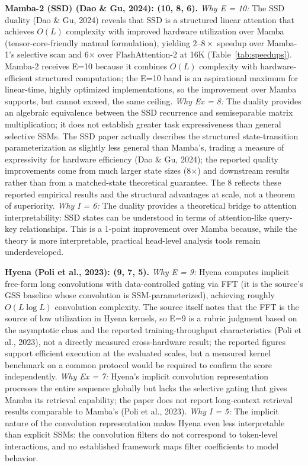 \documentclass[10pt,twocolumn]{article}
\begin{document}
\textbf{Mamba-2 (SSD) (Dao \& Gu, 2024): (10, 8, 6).}
\textit{Why E = 10:} The SSD duality (Dao \& Gu, 2024) reveals that SSD is a structured linear attention that achieves $O(L)$ complexity with improved hardware utilization over Mamba (tensor-core-friendly matmul formulation), yielding $2$--$8\times$ speedup over Mamba-1's selective scan and 6$\times$ over FlashAttention-2 at 16K (Table~\ref{tab:speedups}). Mamba-2 receives E=10 because it combines $O(L)$ complexity with hardware-efficient structured computation; the E=10 band is an aspirational maximum for linear-time, highly optimized implementations, so the improvement over Mamba supports, but cannot exceed, the same ceiling. \textit{Why Ex = 8:} The duality provides an algebraic equivalence between the SSD recurrence and semiseparable matrix multiplication; it does not establish greater task expressiveness than general selective SSMs. The SSD paper actually describes the structured state-transition parameterization as slightly less general than Mamba's, trading a measure of expressivity for hardware efficiency (Dao \& Gu, 2024); the reported quality improvements come from much larger state sizes (8$\times$) and downstream results rather than from a matched-state theoretical guarantee. The 8 reflects these reported empirical results and the structural advantages at scale, not a theorem of superiority. \textit{Why I = 6:} The duality provides a theoretical bridge to attention interpretability: SSD states can be understood in terms of attention-like query-key relationships. This is a 1-point improvement over Mamba because, while the theory is more interpretable, practical head-level analysis tools remain underdeveloped.

\textbf{Hyena (Poli et al., 2023): (9, 7, 5).}
\textit{Why E = 9:} Hyena computes implicit free-form long convolutions with data-controlled gating via FFT (it is the source's GSS baseline whose convolution is SSM-parameterized), achieving roughly $O(L \log L)$ convolution complexity. The source itself notes that the FFT is the source of low utilization in Hyena kernels, so E=9 is a rubric judgment based on the asymptotic class and the reported training-throughput characteristics (Poli et al., 2023), not a directly measured cross-hardware result; the reported figures support efficient execution at the evaluated scales, but a measured kernel benchmark on a common protocol would be required to confirm the score independently. \textit{Why Ex = 7:} Hyena's implicit convolution representation processes the entire sequence globally but lacks the selective gating that gives Mamba its retrieval capability; the paper does not report long-context retrieval results comparable to Mamba's (Poli et al., 2023). \textit{Why I = 5:} The implicit nature of the convolution representation makes Hyena even less interpretable than explicit SSMs: the convolution filters do not correspond to token-level interactions, and no established framework maps filter coefficients to model behavior.
\end{document}
